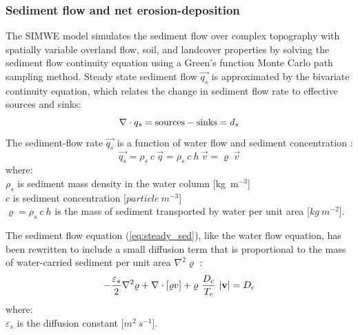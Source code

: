 \documentclass[gmd, manuscript]{copernicus}
\begin{document}

\subsubsection{Sediment flow and net erosion-deposition}

The SIMWE model simulates the sediment flow over complex topography 
with spatially variable overland flow, soil, and landcover properties 
by solving  the sediment flow continuity equation
using a Green's function Monte Carlo path sampling method.
Steady state sediment flow $\vec{q_s}$ is approximated by
the bivariate continuity equation, which relates 
the change in sediment flow rate to effective sources and sinks:
%
\begin{equation}
\label{eq:steady_sed}
\nabla\cdot \vec{q_s} = {\rm sources - sinks}= d_s
\end{equation}
%
\noindent
The sediment-flow rate $\vec{q_s}$ 
is a function of water flow and sediment concentration
\citep{Mitas1998}: %
%
\begin{equation}
\label{eq:sedflow}
\vec{q_s} = \rho_s~c~\vec{q} = \rho_s~c~h~\vec{v} = \varrho~\vec{v}
\end{equation}
{\small
\noindent
where: \\
\hspace*{0.5em} $\rho_s$ is sediment mass density in the water column [\unit{kg~m}$^{-3}$]\\
\hspace*{0.5em} $c$ is sediment concentration [$\unit{particle~m^{-3}}$]\\
\hspace*{0.5em} $\varrho = \rho_s~c~h$ is the mass of sediment transported by water per unit area [$\unit{kg~m^{-2}}$]. 
}

The sediment flow equation (\ref{eq:steady_sed}),
like the water flow equation, 
has been rewritten to include a small diffusion term that is
proportional to the mass of water-carried sediment per unit area 
$\nabla^2 \varrho$ \citep{Mitas1998}:
\begin{equation}
\label{eq:difsedim}
-{\varepsilon_s \over 2}\nabla^2 \varrho
+ \nabla\cdot [\varrho \vec{v}]
 + \varrho~{D_c \over T_c}~|{\bf v}|
= D_c
\end{equation}
{\small
\noindent
where:\\
\noindent
\hspace*{0.5em} $\varepsilon_s$ is the diffusion constant [$\unit{m^2~s^{-1}}$].\\
}
\end{document}
